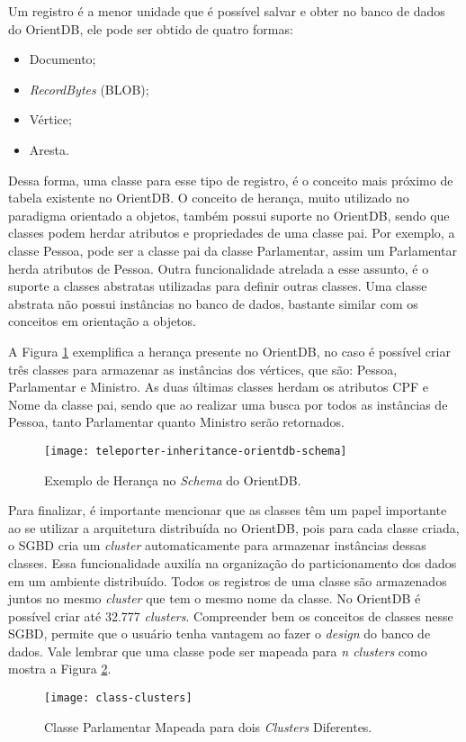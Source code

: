 	Um registro é a menor unidade que é possível salvar e obter no banco de dados do OrientDB, ele pode ser obtido de quatro formas:
	
	\begin{itemize}
		\item Documento;
		\item \textit{RecordBytes} (BLOB);
		\item Vértice;
		\item Aresta.
	\end{itemize}
	
	Dessa forma, uma classe para esse tipo de registro, é o conceito mais próximo de tabela existente no OrientDB. O conceito de herança, muito utilizado no paradigma orientado a objetos, também possui suporte no OrientDB, sendo que classes podem herdar atributos e propriedades de uma classe pai. Por exemplo, a classe Pessoa, pode ser a classe pai da classe Parlamentar, assim um Parlamentar herda atributos de Pessoa. Outra funcionalidade atrelada a esse assunto, é o suporte a classes abstratas utilizadas para definir outras classes. Uma classe abstrata não possui instâncias no banco de dados, bastante similar com os conceitos em orientação a objetos. 
	
	A Figura \ref{fig:inheritance-orient}  exemplifica a herança presente no OrientDB, no caso é possível criar três classes para armazenar as instâncias dos vértices, que são: Pessoa, Parlamentar e Ministro. As duas últimas classes herdam os atributos CPF e Nome da classe pai, sendo que ao realizar uma busca por todos as instâncias de Pessoa, tanto Parlamentar quanto Ministro serão retornados.
	
\begin{figure}[h]
	\centering
    \texttt{[image: teleporter-inheritance-orientdb-schema]}
    \caption{Exemplo de Herança no \textit{Schema} do OrientDB.}
    \label{fig:inheritance-orient}
\end{figure}
	
	Para finalizar, é importante mencionar que as classes têm um papel importante ao se utilizar a arquitetura distribuída no OrientDB, pois para cada classe criada, o SGBD cria um \textit{cluster} automaticamente para armazenar instâncias dessas classes. Essa funcionalidade auxilía na organização do particionamento dos dados em um ambiente distribuído. Todos os registros de uma classe são armazenados juntos no mesmo \textit{cluster} que tem o mesmo nome da classe. No OrientDB é possível criar até 32.777 \textit{clusters}. Compreender bem os conceitos de classes nesse SGBD, permite que o usuário tenha vantagem ao fazer o \textit{design} do banco de dados. Vale lembrar que uma classe pode ser mapeada para \textit{n clusters} como mostra a Figura \ref{fig:class-cluster}.
\begin{figure}[H]
	\centering
    \texttt{[image: class-clusters]}
    \caption{Classe Parlamentar Mapeada para dois \textit{Clusters} Diferentes.}
    \label{fig:class-cluster}
\end{figure}

